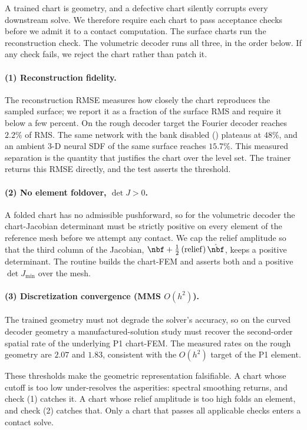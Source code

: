 A trained chart is geometry, and a defective chart silently corrupts every downstream solve. We therefore require each chart to pass acceptance checks before we admit it to a contact computation. The surface charts run the reconstruction check. The volumetric decoder runs all three, in the order below. If any check fails, we reject the chart rather than patch it.

\paragraph{(1) Reconstruction fidelity.} The reconstruction RMSE measures how closely the chart reproduces the sampled surface; we report it as a fraction of the surface RMS and require it below a few percent. On the rough decoder target the Fourier decoder reaches $2.2\%$ of RMS. The same network with the bank disabled () plateaus at $48\%$, and an ambient 3-D neural SDF of the same surface reaches $15.7\%$. This measured separation is the quantity that justifies the chart over the level set. The trainer returns this RMSE directly, and the test  asserts the threshold.

\paragraph{(2) No element foldover, $\det J>0$.} A folded chart has no admissible pushforward, so for the volumetric decoder the chart-Jacobian determinant must be strictly positive on every element of the reference mesh before we attempt any contact. We cap the relief amplitude so that the third column of the Jacobian, $\nbf+\tfrac12\,(\mathrm{relief})\,\hat\nbf$, keeps a positive determinant. The routine  builds the chart-FEM and asserts both  and a positive $\det J_{\min}$ over the mesh.

\paragraph{(3) Discretization convergence (MMS $O(h^2)$).} The trained geometry must not degrade the solver's accuracy, so on the curved decoder geometry a manufactured-solution study must recover the second-order spatial rate of the underlying P1 chart-FEM. The measured rates on the rough geometry are $2.07$ and $1.83$, consistent with the $O(h^2)$ target of the P1 element.

These thresholds make the geometric representation falsifiable. A chart whose cutoff is too low under-resolves the asperities: spectral smoothing returns, and check (1) catches it. A chart whose relief amplitude is too high folds an element, and check (2) catches that. Only a chart that passes all applicable checks enters a contact solve.
